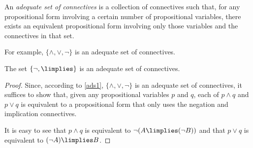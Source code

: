 \begin{definition}
An \emph{adequate set of connectives} is a collection of connectives such that, for any propositional form involving a certain number of propositional variables, there exists an equivalent propositional form involving only those variables and the connectives in that set.

For example, $\{\land,\lor,\lnot\}$ is an adequate set of connectives.
\label{<+label+>}
\end{definition}

\begin{corollary}
The set $\{\lnot,\limplies\}$ is an adequate set of connectives.
\label{adequateni}
\end{corollary}

\begin{proof}
Since, according to \ref{ads1}, $\{\land,\lor,\lnot\}$ is an adequate set of connectives, it suffices to show that, given any propositional variables $p$ and $q$, each of $p\land q$ and $p\lor q$ is equivalent to a propositional form that only uses the negation and implication connectives.

It is easy to see that $p\land q$ is equivalent to $\lnot(A\limplies(\lnot B))$ and that $p\lor q$ is equivalent to $(\lnot A)\limplies B$.
\end{proof}

